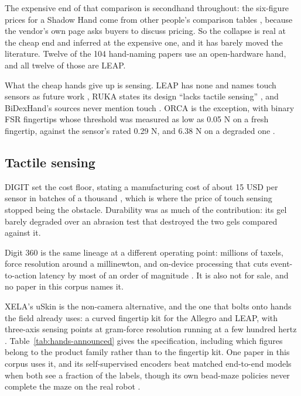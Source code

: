 The expensive end of that comparison is secondhand throughout: the six-figure prices for a Shadow
Hand come from other people's comparison tables \cite{ruka_2025,faive_hand_2023}, because the
vendor's own page asks buyers to discuss pricing. So the collapse is real at the cheap end and
inferred at the expensive one, and it has barely moved the literature. Twelve of the 104
hand-naming papers use an open-hardware hand, and all twelve of those are LEAP.

What the cheap hands give up is sensing. LEAP has none and names touch sensors as future work
\cite{leap_hand_2023}, RUKA states its design ``lacks tactile sensing'' \cite{ruka_2025}, and
BiDexHand's sources never mention touch \cite{bidexhand_2025}. ORCA is the exception, with binary
FSR fingertips whose threshold was measured as low as 0.05 N on a fresh fingertip, against the
sensor's rated 0.29 N, and 6.38 N on a degraded one \cite{orca_hand_2025}.

\subsection{Tactile sensing}
\label{sec:hands:tactile}

DIGIT set the cost floor, stating a manufacturing cost of about 15 USD per sensor in batches of a
thousand \cite{digit_2020}, which is where the price of touch sensing stopped being the obstacle.
Durability was as much of the contribution: its gel barely degraded over an abrasion test that
destroyed the two gels compared against it.

Digit 360 is the same lineage at a different operating point: millions of taxels, force
resolution around a millinewton, and on-device processing that cuts event-to-action latency by most
of an order of magnitude \cite{digit360_2024}. It is also not for sale, and no paper in this corpus
names it.

XELA's uSkin is the non-camera alternative, and the one that bolts onto hands the field already
uses: a curved fingertip kit for the Allegro and LEAP, with three-axis sensing points at
gram-force resolution running at a few hundred hertz \cite{xela_uskin_2020}.
Table~\ref{tab:hands-announced} gives the specification, including which figures belong to the
product family rather than to the fingertip kit. One paper in this corpus uses it, and its
self-supervised encoders beat matched end-to-end models when both see a fraction of the labels,
though its own bead-maze policies never complete the maze on the real robot
\cite{sparsh_2024}.

